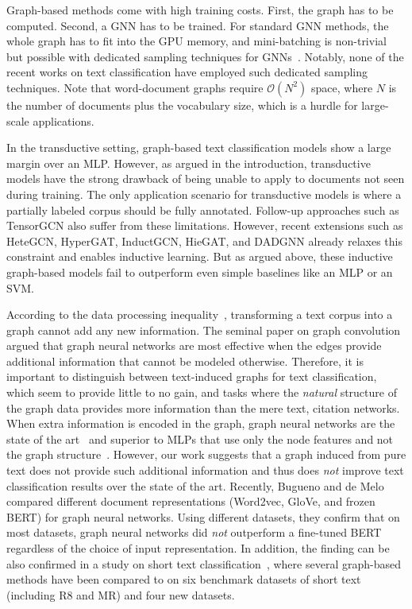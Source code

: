Graph-based methods come with high training costs.
First, the graph has to be computed.
Second, a GNN has to be trained. 
For standard GNN methods, the whole graph has to fit into the GPU memory, and mini-batching is non-trivial but possible with dedicated sampling techniques for GNNs~\cite{DBLP:conf/icml/FeyLWL21}. 
Notably, none of the recent works on text classification have employed such dedicated sampling techniques.
Note that word-document graphs require $\mathcal{O}(N^2)$ space, where $N$ is the number of documents plus the vocabulary size, which is a hurdle for large-scale applications.
 
In the transductive setting, graph-based text classification models show a large margin over an MLP.
However, as argued in the introduction, transductive models have the strong drawback of being unable to apply to documents not seen during training.
The only application scenario for transductive models is where a partially labeled corpus should be fully annotated. 
Follow-up approaches such as TensorGCN also suffer from these limitations.
However, recent extensions such as HeteGCN, HyperGAT, InductGCN, HieGAT, and DADGNN already relaxes this constraint and enables inductive learning.
But as argued above, these inductive graph-based models fail to outperform even simple baselines like an MLP or an SVM.

According to the data processing inequality~\cite{cover_elements_1991}, transforming a text corpus into a graph cannot add any new information.
The seminal paper on graph convolution~\etal\cite{DBLP:conf/iclr/KipfW17} argued that graph neural networks are most effective when the edges provide additional information that cannot be modeled otherwise.
Therefore, it is important to distinguish between text-induced graphs for text classification, which seem to provide little to no gain, and tasks where the \emph{natural} structure of the graph data provides more information than the mere text, \eg citation networks. 
When extra information is encoded in the graph, graph neural networks are the state of the art~\cite{DBLP:conf/iclr/KipfW17,velickovic2018graph} and superior to MLPs that use only the node features and not the graph structure~\cite{DBLP:journals/corr/abs-1811-05868}.
However, our work suggests that a graph induced from pure text does not provide such additional information and thus does \emph{not} improve text classification results over the state of the art.
Recently, Bugueno and de Melo~\cite{buguenoConnectingDotsWhat2023} compared different document representations (Word2vec, GloVe, and frozen BERT) for graph neural networks.
Using different datasets, they confirm that on most datasets, graph neural networks did \emph{not} outperform a fine-tuned BERT regardless of the choice of input representation. In addition, the finding can be also confirmed in a study on short text classification~\cite{DBLP:conf/cdmake/KarlS23},
where several graph-based methods have been compared to \SLMs on six benchmark datasets of short text (including R8 and MR) and four new datasets.

